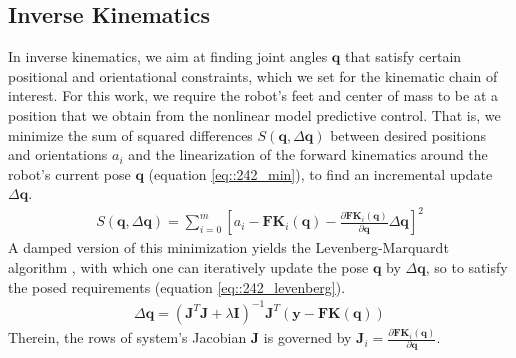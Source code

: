 \subsection{Inverse Kinematics}
\label{sec::242_ik}
In inverse kinematics, we aim at finding joint angles $\bm{q}$ that satisfy certain positional and orientational constraints, which we set for the kinematic chain of interest. For this work, we require the robot's feet and center of mass to be at a position that we obtain from the nonlinear model predictive control. That is, we minimize the sum of squared differences $S(\bm{q},\Delta\bm{q})$ between desired positions and orientations $a_i$ and the linearization of the forward kinematics around the robot's current pose $\bm{q}$ (equation \ref{eq::242_min}), to find an incremental update $\Delta\bm{q}$. 
\begin{align}
	S(\bm{q},\Delta\bm{q}) = \sum_{i=0}^m\left[a_i-\textbf{FK}_i(\bm{q})-\frac{\partial\textbf{FK}_i(\bm{q})}{\partial\bm{q}}\Delta\bm{q}\right]^2
	\label{eq::242_min}
\end{align}
A damped version of this minimization yields the Levenberg-Marquardt algorithm \cite{more1978levenberg}\cite{sugihara2011solvability}, with which one can iteratively update the pose $\bm{q}$ by $\Delta\bm{q}$, so to satisfy the posed requirements (equation \ref{eq::242_levenberg}).
\begin{align}
	\Delta\bm{q} = (\bm{J}^T\bm{J}+\lambda\bm{I})^{-1}\bm{J}^T(\bm{y}-\textbf{FK}(\bm{q}))
	\label{eq::242_levenberg}
\end{align}
Therein, the rows of system's Jacobian $\bm{J}$ is governed by $\bm{J}_i=\frac{\partial\textbf{FK}_i(\bm{q})}{\partial\bm{q}}$.